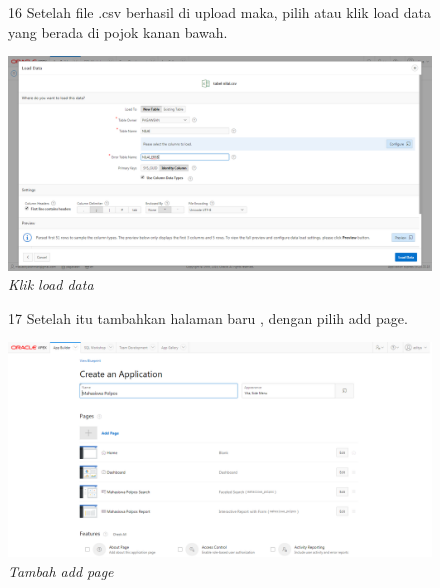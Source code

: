 \begin{enumerate}
\begin{figure}[!htbp]
\item[16] Setelah file .csv berhasil di upload maka, pilih atau klik load data yang berada di pojok kanan bawah.
	\begin{center}
	\includegraphics[scale=0.2]{figures/tahap18.png}
	\caption{\textit{Klik load data}}
	\end{center}	 
\end{figure}

\begin{figure}[!htbp]
\item[17] Setelah itu tambahkan halaman baru , dengan pilih add page.
	\begin{center}
	\includegraphics[scale=0.2]{figures/tahap19.png}
	\caption{\textit{Tambah add page}}
	\end{center}	 
\end{figure}


\end{enumerate}
